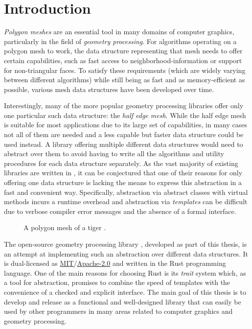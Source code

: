 \chapter{Introduction}

\emph{Polygon meshes} are an essential tool in many domains of computer graphics, particularly in the field of \emph{geometry processing}.
For algorithms operating on a polygon mesh to work, the data structure representing that mesh needs to offer certain capabilities, such as fast access to neighborhood-information or support for non-triangular faces.
To satisfy these requirements (which are widely varying between different algorithms) while still being as fast and as memory-efficient as possible, various mesh data structures have been developed over time.

Interestingly, many of the more popular geometry processing libraries offer only one particular such data structure: the \emph{half edge mesh}.
While the half edge mesh is suitable for most applications due to its large set of capabilities, in many cases not all of them are needed and a less capable but faster data structure could be used instead.
A library offering multiple different data structures would need to abstract over them to avoid having to write all the algorithms and utility procedures for each data structure separately.
As the vast majority of existing libraries are written in \cpp, it can be conjectured that one of their reasons for only offering one data structure is \cpp lacking the means to express this abstraction in a fast and convenient way.
Specifically, abstraction via abstract classes with virtual methods incurs a runtime overhead and abstraction via \emph{\cpp templates} can be difficult due to verbose compiler error messages and the absence of a formal interface.

\vspace{5mm}

\begin{figure}[h]
  \centering
  
  \caption{A polygon mesh of a tiger \cite{tigermodel}.}
\end{figure}

\vspace{1cm}

The open-source geometry processing library , developed as part of this thesis, is an attempt at implementing such an abstraction over different data structures.
It is dual-licensed as \hyperlink{mit}{MIT}/\hyperlink{apache2}{Apache-2.0} and written in the Rust programming language.
One of the main reasons for choosing Rust is its \emph{trait} system which, as a tool for abstraction, promises to combine the speed of \cpp templates with the convenience of a checked and explicit interface.
The main goal of this thesis is to develop and release  as a functional and well-designed library that can easily be used by other programmers in many areas related to computer graphics and geometry processing.

